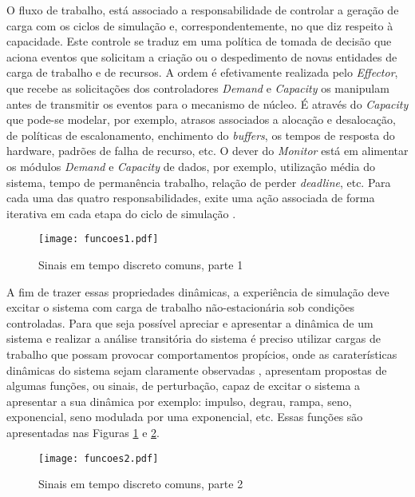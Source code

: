 O fluxo de trabalho, está associado a responsabilidade de controlar a geração de carga com os ciclos de simulação e, correspondentemente, no que diz respeito à capacidade. Este controle se traduz em uma política de tomada de decisão que aciona eventos que solicitam a criação ou o despedimento de novas entidades de carga de trabalho e de recursos. A ordem é efetivamente realizada pelo \textit{Effector}, que recebe as solicitações dos controladores \textit{Demand} e \textit{Capacity} os manipulam antes de transmitir os eventos para o mecanismo de núcleo. É através do \textit{Capacity} que pode-se modelar, por exemplo, atrasos associados a alocação e desalocação, de políticas de escalonamento, enchimento do \textit{buffers}, os tempos de resposta do hardware, padrões de falha de recurso, etc. O dever do \textit{Monitor} está em alimentar os módulos \textit{Demand} e \textit{Capacity} de dados, por exemplo, utilização média do sistema, tempo de permanência trabalho, relação de perder \textit{deadline}, etc. Para cada uma das quatro responsabilidades, exite uma ação associada de forma iterativa em cada etapa do ciclo de simulação \cite{Lourenco2015}. 

\begin{figure}[!htb]
	\centering
	\texttt{[image: funcoes1.pdf]}
	\caption{Sinais em tempo discreto comuns, parte 1}
	\label{fig:funcoes1}
\end{figure}

A fim de trazer essas propriedades dinâmicas, a experiência de simulação deve excitar o sistema com carga de trabalho não-estacionária sob condições controladas. Para que seja possível apreciar e apresentar a dinâmica de um sistema e realizar a análise transitória do sistema é preciso utilizar cargas de trabalho que possam provocar comportamentos propícios, onde as caraterísticas dinâmicas do sistema sejam claramente observadas , apresentam propostas de algumas funções, ou sinais, de perturbação, capaz de excitar o sistema a apresentar a sua dinâmica por exemplo: impulso, degrau, rampa, seno, exponencial, seno modulada por uma exponencial, etc.  Essas funções são apresentadas nas Figuras \ref{fig:funcoes1} e \ref{fig:funcoes2}.

\begin{figure}[!htb]
	\centering
	\texttt{[image: funcoes2.pdf]}
	\caption{Sinais em tempo discreto comuns, parte 2}
	\label{fig:funcoes2}
\end{figure}

